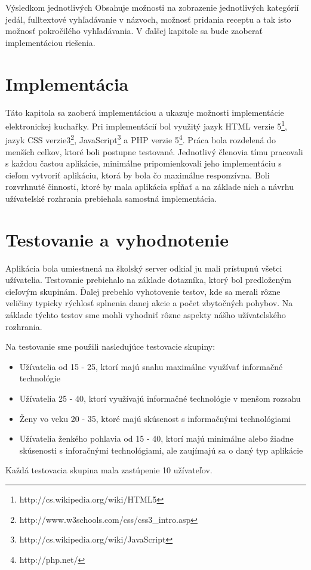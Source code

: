 \documentclass[12pt,a4paper,titlepage,final]{article}
\begin{document}
Výsledkom jednotlivých Obsahuje možnosti na zobrazenie jednotlivých kategórií jedál, fulltextové vyhľadávanie v názvoch, možnosť pridania receptu  a tak isto možnosť pokročilého vyhľadávania. V ďalšej kapitole sa bude zaoberať implementáciou riešenia. 



\section{Implementácia}
Táto kapitola sa zaoberá implementáciou a ukazuje možnosti implementácie elektronickej kuchařky. Pri implementácií bol využitý jazyk HTML verzie 5\footnote{http://cs.wikipedia.org/wiki/HTML5}, jazyk CSS verzie3\footnote{http://www.w3schools.com/css/css3_intro.asp}, JavaScript\footnote{http://cs.wikipedia.org/wiki/JavaScript} a PHP verzie 5\footnote{http://php.net/}. Práca bola rozdelená do menších celkov, ktoré boli postupne testované. Jednotlivý členovia tímu pracovali s každou častou aplikácie, minimálne pripomienkovali jeho implementáciu s cieľom vytvoriť aplikáciu, ktorá by bola čo maximálne responzívna. Boli rozvrhnuté činnosti, ktoré by mala aplikácia spĺňať a na základe nich a návrhu užívateľské rozhrania prebiehala samostná implementácia.


\section{Testovanie a vyhodnotenie}
Aplikácia bola umiestnená na školský server odkiaľ ju mali prístupnú všetci užívatelia. Testovanie prebiehalo na základe dotazníka, ktorý bol predloženým cieľovým skupinám. Ďalej prebehlo vyhotovenie testov, kde sa merali rôzne veličiny typicky rýchlosť splnenia danej akcie a počet zbytočných pohybov. Na základe týchto testov sme mohli vyhodniť rôzne aspekty nášho užívatelského rozhrania. 

Na testovanie sme použili nasledujúce testovacie skupiny:
\begin{itemize}
\item Užívatelia od 15 - 25, ktorí majú snahu maximálne využívať informačné technológie
\item Užívatelia 25 - 40, ktorí využívajú informačné technológie v menšom rozsahu
\item Ženy vo veku 20 - 35, ktoré majú skúsenost s informačnými technológiami
\item Užívatelia ženkého pohlavia od 15 - 40, ktorí majú minimálne alebo žiadne skúsenosti s inforačnými technológiami, ale zaujímajú sa o daný typ aplikácie
\end{itemize}
Každá testovacia skupina mala zastúpenie 10 užívateľov.
\end{document}
